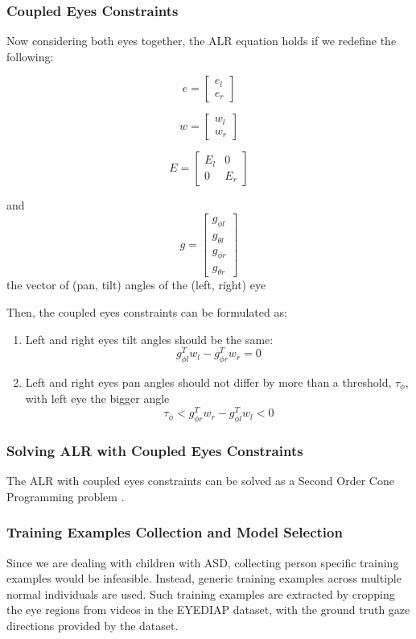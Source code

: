 \subsubsection{Coupled Eyes Constraints}
Now considering both eyes together, the ALR equation holds if we redefine the following:

\[  e = \begin{bmatrix}
e_l \\ e_r
\end{bmatrix}   \]

\[  w = \begin{bmatrix}
w_l \\ w_r
\end{bmatrix}   \]

\[  E = \begin{bmatrix}
E_l	&	0 \\
0	&	E_r
\end{bmatrix}  \]

and \[g = \begin{bmatrix}
g_{\phi l} \\ g_{\theta l} \\ g_{\phi r} \\ g_{\theta r}
\end{bmatrix}  \]
the vector of (pan, tilt) angles of the (left, right) eye

Then, the coupled eyes constraints can be formulated as: 
\begin{enumerate}
	\item Left and right eyes tilt angles should be the same:
	\[ g_{\phi l}^T w_l -  g_{\phi r}^T w_r = 0 \]
	
	\item Left and right eyes pan angles should not differ by more than a threshold, \(\tau_\phi\), with left eye the bigger angle
	\[  \tau_\phi < g_{\phi r}^T w_r - g_{\phi l}^T w_l < 0 \]
\end{enumerate}


\subsubsection{Solving ALR with Coupled Eyes Constraints}
The ALR with coupled eyes constraints can be solved as a Second Order Cone Programming problem \cite{funes2013person, kim2001second}.


\subsubsection{Training Examples Collection and Model Selection}
Since we are dealing with children with ASD, collecting person specific training examples would be infeasible.  Instead, generic training examples across multiple normal individuals are used.  Such training examples are extracted by cropping the eye regions from videos in the EYEDIAP dataset, with the ground truth gaze directions provided by the dataset.

